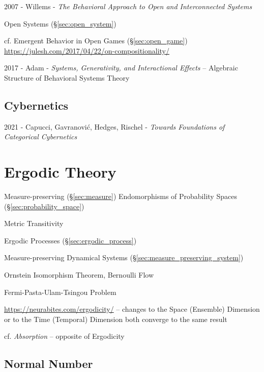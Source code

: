 2007 - Willems - \emph{The Behavioral Approach to Open and Interconnected
  Systems}

\fist Open Systems (\S\ref{sec:open_system})

\fist cf. Emergent Behavior in Open Games (\S\ref{sec:open_game})
\url{https://julesh.com/2017/04/22/on-compositionality/}

2017 - Adam - \emph{Systems, Generativity, and Interactional Effects}
-- Algebraic Structure of Behavioral Systems Theory



\subsection{Cybernetics}\label{sec:cybernetics}

2021 - Capucci, Gavranovi\'c, Hedges, Rischel -
\emph{Towards Foundations of Categorical Cybernetics}



\section{Ergodic Theory}\label{sec:ergodic_theory}

Measure-preserving (\S\ref{sec:measure}) Endomorphisms of Probability Spaces
(\S\ref{sec:probability_space})

Metric Transitivity

\fist Ergodic Processes (\S\ref{sec:ergodic_process})

\fist Measure-preserving Dynamical Systems
(\S\ref{sec:measure_preserving_system})

Ornstein Isomorphism Theorem, Bernoulli Flow

Fermi-Pasta-Ulam-Tsingou Problem

\url{https://neurabites.com/ergodicity/} -- changes to the Space (Ensemble)
Dimension or to the Time (Temporal) Dimension both converge to the same result

cf. \emph{Absorption} -- opposite of Ergodicity



\subsection{Normal Number}\label{sec:normal_number}

